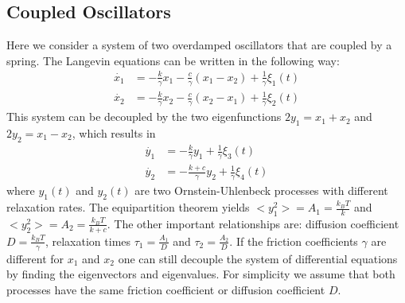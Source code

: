 \documentclass[%
 reprint,
 amsmath,amssymb,
 aps,
]{revtex4-1}
\begin{document}
\subsection{Coupled Oscillators}
Here we consider a system of two overdamped oscillators that are coupled by a spring.  The Langevin equations can be written in the following way:
\begin{equation}
	\begin{aligned}
		\dot{x_1} &= -\frac{k}{\gamma}x_{1}-\frac{c}{\gamma}(x_{1}-x_{2}) +\frac{1}{\gamma}\xi_{1}(t)\\
		\dot{x_2} &= -\frac{k}{\gamma}x_{2}-\frac{c}{\gamma}(x_{2}-x_{1}) +\frac{1}{\gamma}\xi_{2}(t)
	\end{aligned}
\end{equation}
This system can be decoupled by the two eigenfunctions $2y_{1}=x_{1}+x_{2}$ and $2y_{2}=x_{1}-x_{2}$, which results in
\begin{equation}
	\begin{aligned}
		\dot{y_1} &= -\frac{k}{\gamma}y_{1} +\frac{1}{\gamma}\xi_{3}(t)\\
		\dot{y_2} &= -\frac{k+c}{\gamma}y_{2} +\frac{1}{\gamma}\xi_{4}(t)
	\end{aligned}
\end{equation}
where $y_{1}(t)$ and $y_{2}(t)$ are two Ornstein-Uhlenbeck processes with different relaxation rates.  The equipartition theorem yields $<y_{1}^{2}> = A_{1} = \frac{k_{B}T}{k}$ and $<y_{2}^{2}> = A_{2} = \frac{k_{B}T}{k+c}$.  The other important relationships are: diffusion coefficient $D=\frac{k_{B}T}{\gamma}$, relaxation times $\tau_{1}=\frac{A_{1}}{D}$ and $\tau_{2}=\frac{A_{2}}{D}$. If the friction coefficients $\gamma$ are different for $x_{1}$ and $x_{2}$ one can still decouple the system of differential equations by finding the eigenvectors and eigenvalues.  For simplicity we assume that both processes have the same friction coefficient or diffusion coefficient $D$.
\end{document}

